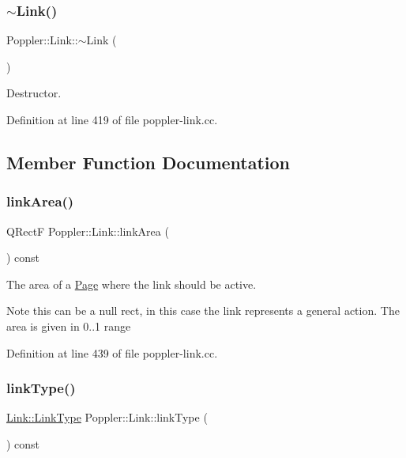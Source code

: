 \subsubsection{\texorpdfstring{$\sim$\+Link()}{~Link()}}
{\footnotesize\ttfamily Poppler\+::\+Link\+::$\sim$\+Link (\begin{DoxyParamCaption}{ }\end{DoxyParamCaption})\hspace{0.3cm}{\ttfamily [virtual]}}

Destructor. 

Definition at line 419 of file poppler-\/link.\+cc.



\subsection{Member Function Documentation}
\mbox{\label{class_poppler_1_1_link_adb525b65cfac39dcdba3f59faa57a0bf}} 
\subsubsection{\texorpdfstring{link\+Area()}{linkArea()}}
{\footnotesize\ttfamily Q\+RectF Poppler\+::\+Link\+::link\+Area (\begin{DoxyParamCaption}{ }\end{DoxyParamCaption}) const}

The area of a \hyperlink{class_poppler_1_1_page}{Page} where the link should be active.

\begin{DoxyNote}{Note}
this can be a null rect, in this case the link represents a general action. The area is given in 0..1 range 
\end{DoxyNote}


Definition at line 439 of file poppler-\/link.\+cc.

\mbox{\label{class_poppler_1_1_link_a3e3ad7e8867e255c24b9a562bad596ed}} 
\subsubsection{\texorpdfstring{link\+Type()}{linkType()}}
{\footnotesize\ttfamily \hyperlink{class_poppler_1_1_link_af0dacfa77a548bb043dbae4bb9dc6c1e}{Link\+::\+Link\+Type} Poppler\+::\+Link\+::link\+Type (\begin{DoxyParamCaption}{ }\end{DoxyParamCaption}) const\hspace{0.3cm}{\ttfamily [virtual]}}

